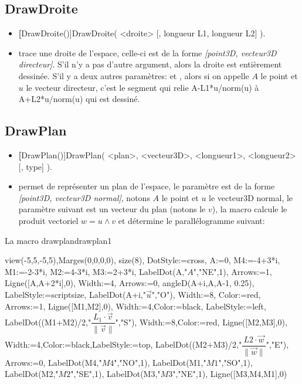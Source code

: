 \subsection{DrawDroite}
\begin{itemize}
 \item \util \textbf[DrawDroite()]{DrawDroite( <droite> [, longueur L1, longueur L2] )}.
 \item \desc trace une droite de l'espace, celle-ci est de la forme \textsl{[point3D, vecteur3D directeur]}. S'il n'y a pas d'autre argument, alors la droite est entièrement dessinée. S'il y a deux autres paramètres:  et , alors si on appelle $A$ le point et $u$ le vecteur directeur, c'est le segment qui relie A-L1*u/norm(u) à A+L2*u/norm(u) qui est dessiné.
\end{itemize}


\subsection{DrawPlan}
\begin{itemize}
 \item \util \textbf[DrawPlan()]{DrawPlan( <plan>, <vecteur3D>, <longueur1>, <longueur2> [, type] )}.
 \item \desc permet de représenter un plan de l'espace, le paramètre  est de la forme \textsl{[point3D, vecteur3D normal]}, notons $A$ le point et $u$ le vecteur3D normal, le paramètre suivant est un vecteur du plan (notons le $v$), la macro calcule le produit vectoriel $w=u \wedge v$ et détermine le parallélogramme suivant: 
\end{itemize}


\begin{demo}{La macro drawplan}{drawplan1}
\begin{texgraph}[name=drawplan1]
view(-5,5,-5,5),Marges(0,0,0,0), size(8), DotStyle:=cross,
A:=0, M4:=-4+3*i, M1:=-2-3*i, M2:=4-3*i, M3:=2+3*i,
LabelDot(A,"$A$","NE",1), Arrows:=1, Ligne([A,A+2*i],0),
Width:=4, Arrows:=0, angleD(A+i,A,A-1, 0.25),
LabelStyle:=scriptsize, LabelDot(A+i,"$\vec{u}$","O"),
Width:=8, Color:=red, Arrows:=1, Ligne([M1,M2],0),
Width:=4,Color:=black, LabelStyle:=left,
LabelDot((M1+M2)/2,"$\dfrac{L_1\cdot\vec{v}}{\|\vec{v}\|}$","S"),
Width:=8,Color:=red, Ligne([M2,M3],0),
Width:=4,Color:=black,LabelStyle:=top,
LabelDot((M2+M3)/2,"$\dfrac{L2\cdot\vec{w}}{\|\vec{w}\|}$","E"),
Arrows:=0,
LabelDot(M4,"$M4$","NO",1),
LabelDot(M1,"$M1$","SO",1),
LabelDot(M2,"$M2$","SE",1),
LabelDot(M3,"$M3$","NE",1),
Ligne([M3,M4,M1],0)
\end{texgraph}
\end{demo}

